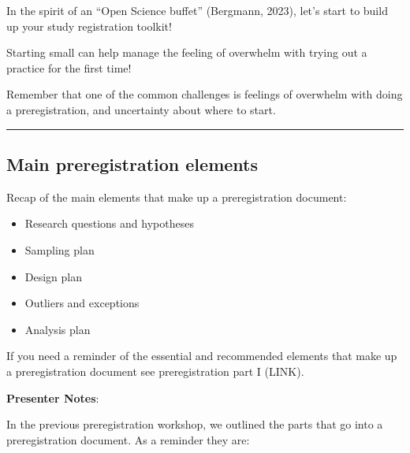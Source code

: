 \documentclass[
  letterpaper,
  DIV=11,
  numbers=noendperiod]{scrartcl}
\providecommand{\tightlist}{%
  \setlength{\itemsep}{0pt}\setlength{\parskip}{0pt}}
\begin{document}
In the spirit of an ``Open Science buffet'' (Bergmann, 2023), let's
start to build up your study registration toolkit!

Starting small can help manage the feeling of overwhelm with trying out
a practice for the first time!

Remember that one of the common challenges is feelings of overwhelm with
doing a preregistration, and uncertainty about where to start.

\begin{center}\rule{0.5\linewidth}{0.5pt}\end{center}

\subsection{Main preregistration
elements}\label{main-preregistration-elements}

Recap of the main elements that make up a preregistration document:

\begin{itemize}
\tightlist
\item[$\square$]
  Research questions and hypotheses
\item[$\square$]
  Sampling plan
\item[$\square$]
  Design plan
\item[$\square$]
  Outliers and exceptions
\item[$\square$]
  Analysis plan
\end{itemize}

\begin{tcolorbox}[enhanced jigsaw, arc=.35mm, bottomrule=.15mm, bottomtitle=1mm, breakable, colback=white, colbacktitle=quarto-callout-tip-color!10!white, colframe=quarto-callout-tip-color-frame, coltitle=black, left=2mm, leftrule=.75mm, opacityback=0, opacitybacktitle=0.6, rightrule=.15mm, title=\textcolor{quarto-callout-tip-color}{\faLightbulb}\hspace{0.5em}{Tip}, titlerule=0mm, toprule=.15mm, toptitle=1mm]

If you need a reminder of the essential and recommended elements that
make up a preregistration document see preregistration part I (LINK).

\end{tcolorbox}

\textbf{Presenter Notes}:

In the previous preregistration workshop, we outlined the parts that go
into a preregistration document. As a reminder they are:
\end{document}
